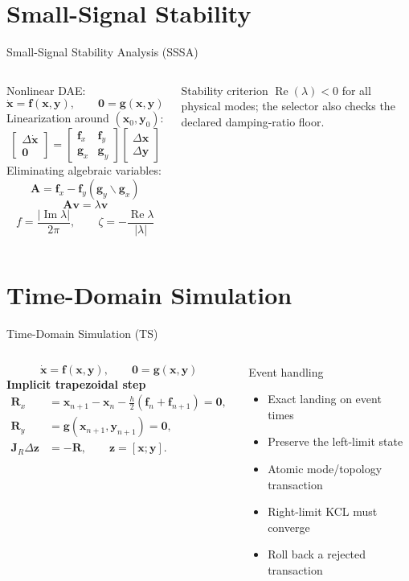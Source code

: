 \documentclass{beamer}
\begin{document}
\section{Small-Signal Stability}
\begin{frame}{Small-Signal Stability Analysis (SSSA)}
\begin{columns}[c,onlytextwidth]
\small
Nonlinear DAE:
\[
\dot{\bm{x}}=\bm{f}(\bm{x},\bm{y}),\qquad
\bm{0}=\bm{g}(\bm{x},\bm{y})
\]
Linearization around $(\bm{x}_0,\bm{y}_0)$:
\[
\begin{bmatrix}\Delta\dot{\bm{x}}\\\bm{0}\end{bmatrix}=
\begin{bmatrix}\bm{f}_x&\bm{f}_y\\\bm{g}_x&\bm{g}_y\end{bmatrix}
\begin{bmatrix}\Delta\bm{x}\\\Delta\bm{y}\end{bmatrix}
\]
Eliminating algebraic variables:
\[
\boxed{\bm{A}=\bm{f}_x-\bm{f}_y(\bm{g}_y\backslash\bm{g}_x)}
\]
\small
\[
\boxed{\bm{A}\bm{v}=\lambda\bm{v}}
\]
\[
f=\frac{|\operatorname{Im}\lambda|}{2\pi},\qquad
\zeta=-\frac{\operatorname{Re}\lambda}{|\lambda|}
\]
\begin{block}{Stability criterion}
$\operatorname{Re}(\lambda)<0$ for all physical modes; the selector also checks the declared damping-ratio floor.
\end{block}
\end{columns}
\end{frame}
\section{Time-Domain Simulation}
\begin{frame}{Time-Domain Simulation (TS)}
\begin{columns}[c,onlytextwidth]
\small
\[ \dot{\bm{x}}=\bm{f}(\bm{x},\bm{y}),\qquad \bm{0}=\bm{g}(\bm{x},\bm{y}) \]
\textbf{Implicit trapezoidal step}
\begin{align*}
\bm{R}_x &= \bm{x}_{n+1}-\bm{x}_{n}-\frac{h}{2}(\bm{f}_{n}+\bm{f}_{n+1})=\bm{0},\\
\bm{R}_y &= \bm{g}(\bm{x}_{n+1},\bm{y}_{n+1})=\bm{0},\\
\boxed{\bm{J}_R\Delta\bm{z}}&=\boxed{-\bm{R}},\qquad \bm{z}=[\bm{x};\bm{y}].
\end{align*}
\small
\begin{block}{Event handling}
\begin{itemize}
  \item Exact landing on event times
  \item Preserve the left-limit state
  \item Atomic mode/topology transaction
  \item Right-limit KCL must converge
  \item Roll back a rejected transaction
\end{itemize}
\end{block}
\end{columns}
\end{frame}
\end{document}

